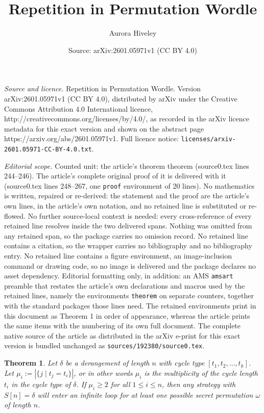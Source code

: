 \documentclass[10pt,a4paper]{amsart}
\title{Repetition in Permutation Wordle}
\author{Aurora Hiveley}
\date{Source: arXiv:2601.05971v1 (CC BY 4.0)}
\newtheorem{theorem}{Theorem}
\begin{document}
\maketitle

\noindent\emph{Source and licence.} Repetition in Permutation Wordle. Version arXiv:2601.05971v1 (CC BY 4.0), distributed by arXiv under the Creative Commons Attribution 4.0 International licence, http://creativecommons.org/licenses/by/4.0/, as recorded in the arXiv licence metadata for this exact version and shown on the abstract page https://arxiv.org/abs/2601.05971v1. Full licence notice: \texttt{licenses/arxiv-2601.05971-CC-BY-4.0.txt}.\par\smallskip

\noindent\textit{Editorial scope.} Counted unit: the article's theorem theorem (source0.tex lines 244--246). The article's complete original proof of it is delivered with it (source0.tex lines 248--267, one \texttt{proof} environment of 20 lines). No mathematics is written, repaired or re-derived: the statement and the proof are the article's own lines, in the article's own notation, and no retained line is substituted or re-flowed.  No further source-local context is needed: every cross-reference of every retained line resolves inside the two delivered spans.  Nothing was omitted from any retained span, so the package carries no omission record.  No retained line contains a citation, so the wrapper carries no bibliography and no bibliography entry.  No retained line contains a figure environment, an image-inclusion command or drawing code, so no image is delivered and the package declares no asset dependency.  Editorial formatting only, in addition: an AMS \texttt{amsart} preamble that restates the article's own declarations and macros used by the retained lines, namely the environments \texttt{theorem} on separate counters, together with the standard packages those lines need.  The retained environments print in this document as Theorem 1 in order of appearance, whereas the article prints the same items with the numbering of its own full document.  The complete native source of the article as distributed in the arXiv e-print for this exact version is bundled unchanged as \texttt{sources/192380/source0.tex}.
\begin{theorem}
    Let $\delta$ be a derangement of length $n$ with cycle type $[t_1, t_2, \dots, t_k]$. Let $\mu_i := |\{ j \mid t_j = t_i \}|$, or in other words $\mu_i$ is the multiplicity of the cycle length $t_i$ in the cycle type of $\delta$. If $\mu_i \geq 2$ for all $1 \leq i \leq n$, then any strategy with $S[n] = \delta$ will enter an infinite loop for at least one possible secret permutation $\omega$ of length $n$.
\end{theorem}
\end{document}

